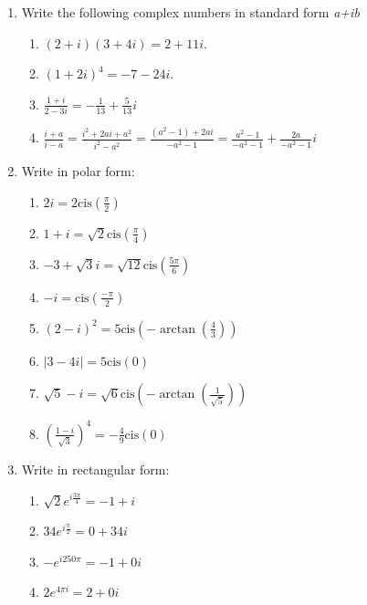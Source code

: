 \documentclass{article}
\begin{document}
\begin{enumerate}
	\item Write the following complex numbers in standard form \textit{a+ib}
	\begin{enumerate}
		\item $(2 + i)(3 + 4i) = 2 + 11i$.
		\item $(1 + 2i)^4 = -7-24i$.
		\item $\frac{1+i}{2-3i} = - \frac{1}{13} + \frac{5}{13}i $
		\item $\frac{i + a}{i-a} = \frac{i^2 + 2ai + a^2}{i^2 - a^2} = \frac{(a^2 - 1) + 2ai}{-a^2 - 1} = \frac{a^2 - 1}{-a^2 - 1} + \frac{2a}{-a^2 - 1}i$
	\end{enumerate}

	\item Write in polar form:
	\begin{enumerate}
		\item $2i = 2\text{cis}(\frac{\pi}{2})$
		\item $1 + i = \sqrt{2}\text{cis}(\frac{\pi}{4})$
		\item $-3 + \sqrt{3}i =  \sqrt{12}\text{cis}(\frac{5\pi}{6})$
		\item $-i = \text{cis}(\frac{-\pi}{2})$
		\item $(2-i)^2 =  5\text{cis}(-\arctan(\frac{4}{3}))$
		\item $|3-4i|=  5\text{cis}(0)$
		\item $\sqrt{5}-i= \sqrt{6}\text{cis}(-\arctan(\frac{1}{\sqrt{5}}))$
		\item $(\frac{1-i}{\sqrt{3}})^4 =  -\frac{4}{9}\text{cis}(0)$
	\end{enumerate}

	\item Write in rectangular form:
	\begin{enumerate}
		\item $\sqrt{2}e^{i\frac{3\pi}{4}} = -1 + i $
		\item $34e^{i\frac{\pi}{2}} = 0 + 34i $
		\item $-e^{i250\pi} = -1 + 0i$
		\item $2e^{4\pi i} = 2 + 0i$
	\end{enumerate}
	

\end{enumerate}
\end{document}
